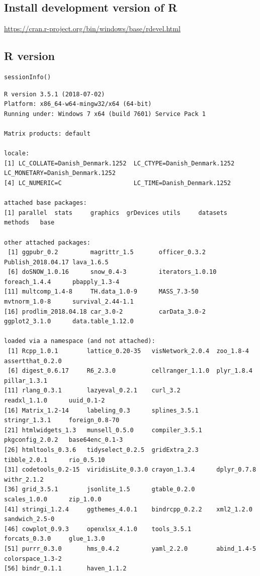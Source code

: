 \documentclass{article}
\begin{document}
\subsection{Install development version of R}
\label{sec:org5fd0ace}
\url{https://cran.r-project.org/bin/windows/base/rdevel.html}

\subsection{R version}
\label{sec:org9544e86}

\lstset{language=r,label= ,caption= ,captionpos=b,numbers=none}
\begin{lstlisting}
sessionInfo()
\end{lstlisting}

\begin{verbatim}
R version 3.5.1 (2018-07-02)
Platform: x86_64-w64-mingw32/x64 (64-bit)
Running under: Windows 7 x64 (build 7601) Service Pack 1

Matrix products: default

locale:
[1] LC_COLLATE=Danish_Denmark.1252  LC_CTYPE=Danish_Denmark.1252    LC_MONETARY=Danish_Denmark.1252
[4] LC_NUMERIC=C                    LC_TIME=Danish_Denmark.1252    

attached base packages:
[1] parallel  stats     graphics  grDevices utils     datasets  methods   base     

other attached packages:
 [1] ggpubr_0.2         magrittr_1.5       officer_0.3.2      Publish_2018.04.17 lava_1.6.5        
 [6] doSNOW_1.0.16      snow_0.4-3         iterators_1.0.10   foreach_1.4.4      pbapply_1.3-4     
[11] multcomp_1.4-8     TH.data_1.0-9      MASS_7.3-50        mvtnorm_1.0-8      survival_2.44-1.1 
[16] prodlim_2018.04.18 car_3.0-2          carData_3.0-2      ggplot2_3.1.0      data.table_1.12.0 

loaded via a namespace (and not attached):
 [1] Rcpp_1.0.1        lattice_0.20-35   visNetwork_2.0.4  zoo_1.8-4         assertthat_0.2.0 
 [6] digest_0.6.17     R6_2.3.0          cellranger_1.1.0  plyr_1.8.4        pillar_1.3.1     
[11] rlang_0.3.1       lazyeval_0.2.1    curl_3.2          readxl_1.1.0      uuid_0.1-2       
[16] Matrix_1.2-14     labeling_0.3      splines_3.5.1     stringr_1.3.1     foreign_0.8-70   
[21] htmlwidgets_1.3   munsell_0.5.0     compiler_3.5.1    pkgconfig_2.0.2   base64enc_0.1-3  
[26] htmltools_0.3.6   tidyselect_0.2.5  gridExtra_2.3     tibble_2.0.1      rio_0.5.10       
[31] codetools_0.2-15  viridisLite_0.3.0 crayon_1.3.4      dplyr_0.7.8       withr_2.1.2      
[36] grid_3.5.1        jsonlite_1.5      gtable_0.2.0      scales_1.0.0      zip_1.0.0        
[41] stringi_1.2.4     ggthemes_4.0.1    bindrcpp_0.2.2    xml2_1.2.0        sandwich_2.5-0   
[46] cowplot_0.9.3     openxlsx_4.1.0    tools_3.5.1       forcats_0.3.0     glue_1.3.0       
[51] purrr_0.3.0       hms_0.4.2         yaml_2.2.0        abind_1.4-5       colorspace_1.3-2 
[56] bindr_0.1.1       haven_1.1.2
\end{verbatim}
\end{document}
